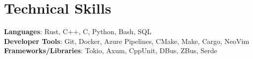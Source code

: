 \section{Technical Skills}
 \begin{itemize}[leftmargin=0.15in, label={}]
    \small{\item{
     \textbf{Languages}{: Rust, C++, C, Python, Bash, SQL} \\
     \textbf{Developer Tools}{: Git, Docker, Azure Pipelines, CMake, Make, Cargo, NeoVim} \\
     \textbf{Frameworks/Libraries}{: Tokio, Axum, CppUnit, DBus, ZBus, Serde}
    }}
 \end{itemize}
